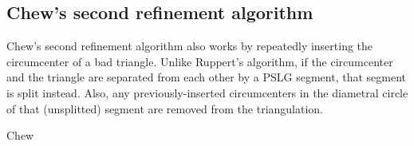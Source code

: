 \subsection{Chew's second refinement algorithm}
\label{sub:chews}
\nocite{art:Rand2011}

Chew's second refinement algorithm also works by repeatedly inserting the circumcenter of a bad triangle.
Unlike Ruppert's algorithm, if the circumcenter and the triangle are separated from each other by a PSLG segment, that segment is split instead.
Also, any previously-inserted circumcenters in the diametral circle of that (unsplitted) segment are removed from the triangulation.
\cite{shewchuk}

\begin{algorithm}
    \caption{Chew}
    \begin{algorithmic}
                \Else
                \EndIf
            \EndWhile
        \EndFunction
    \end{algorithmic}
\end{algorithm}

